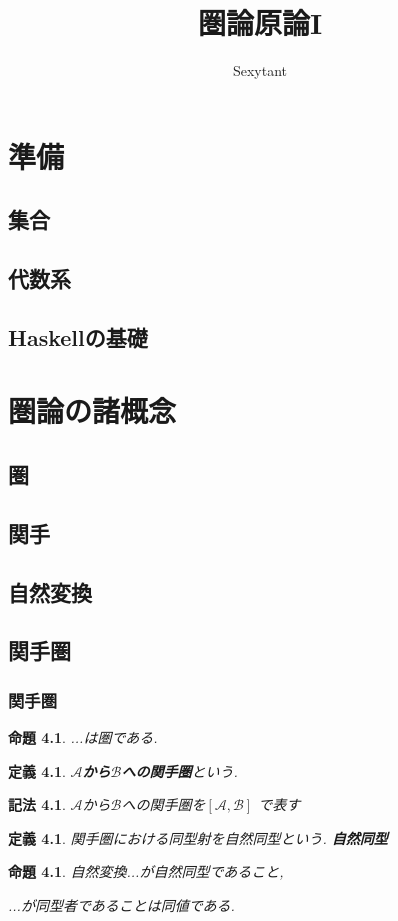 \documentclass[dvipdfmx]{jsbook}
\title{圏論原論I}
\author{Sexytant}
\theoremstyle{plain}
\newtheorem{Def}[thm]{定義}
\newtheorem{Notation}[thm]{記法}
\newtheorem{Prop}[thm]{命題}
\begin{document}
\setcounter{tocdepth}{2}
\maketitle
\tableofcontents
\newpage
\part{準備}
\chapter{集合}


\chapter{代数系}


\chapter{Haskellの基礎}


\part{圏論の諸概念}
\chapter{圏}


\chapter{関手}


\chapter{自然変換}


\chapter{関手圏}
\section{関手圏}
\begin{Prop}
...は圏である.
\end{Prop}
\begin{Def}
{\bf $\mathscr{A}$から$\mathscr{B}$への関手圏}という.
\end{Def}
\begin{Notation}
$\mathscr{A}$から$\mathscr{B}$への関手圏を$[\mathscr{A},\mathscr{B}]$
で表す\end{Notation}
\begin{Def}
関手圏における同型射を自然同型という.
\bf{自然同型}
\end{Def}
\begin{Prop}
自然変換...が自然同型であること,

...が同型者であることは同値である.
\end{Prop}
\end{document}
